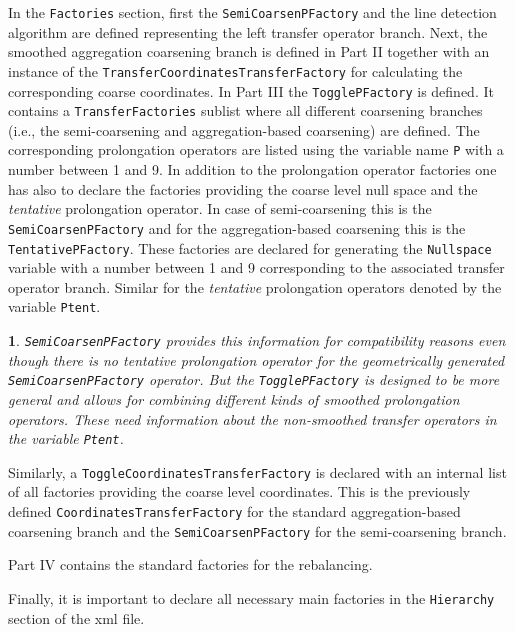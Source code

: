 \documentclass[10pt,fleqn]{book}
\newtheorem*{mycomment}{\ding{42}}
\begin{document}
In the \verb|Factories| section, first the \verb|SemiCoarsenPFactory| and the line detection algorithm are defined representing the left transfer operator branch. Next, the smoothed aggregation coarsening branch is defined in Part II together with an instance of the \verb|TransferCoordinatesTransferFactory| for calculating the corresponding coarse coordinates.
In Part III the \verb|TogglePFactory| is defined. It contains a \verb|TransferFactories| sublist where all different coarsening branches (i.e., the semi-coarsening and aggregation-based coarsening) are defined. The corresponding prolongation operators are listed using the variable name \verb|P| with a number between 1 and 9. In addition to the prolongation operator factories one has also to declare the factories providing the coarse level null space and the \textit{tentative} prolongation operator. In case of semi-coarsening this is the \verb|SemiCoarsenPFactory| and for the aggregation-based coarsening this is the \verb|TentativePFactory|. These factories are declared for generating the \verb|Nullspace| variable with a number between 1 and 9 corresponding to the associated transfer operator branch. Similar for the \textit{tentative} prolongation operators denoted by the variable \verb|Ptent|.

\begin{mycomment}
\verb|SemiCoarsenPFactory| provides this information for compatibility reasons even though there is no tentative prolongation operator for the geometrically generated \verb|SemiCoarsenPFactory| operator. But the \verb|TogglePFactory| is designed to be more general and allows for combining different kinds of smoothed prolongation operators. These need information about the non-smoothed transfer operators in the variable \verb|Ptent|.
\end{mycomment}

Similarly, a \verb|ToggleCoordinatesTransferFactory| is declared with an internal list of all factories providing the coarse level coordinates. This is the previously defined \verb|CoordinatesTransferFactory| for the standard aggregation-based coarsening branch and the \verb|SemiCoarsenPFactory| for the semi-coarsening branch.

Part IV contains the standard factories for the rebalancing.

Finally, it is important to declare all necessary main factories in the \verb|Hierarchy| section of the xml file.
\end{document}

